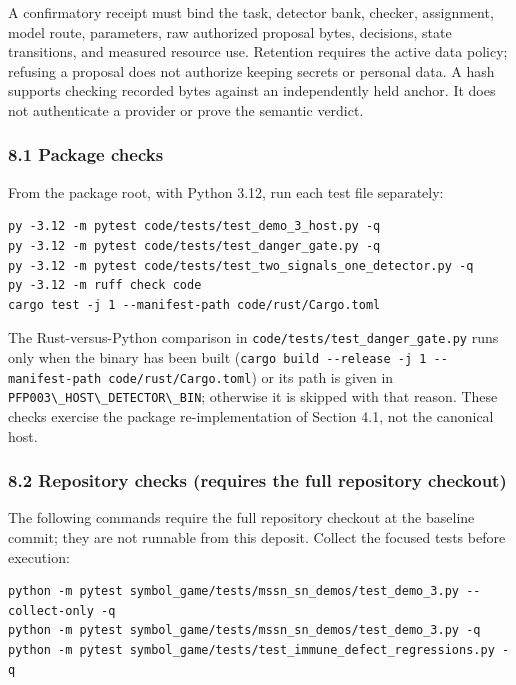 \documentclass[
  11pt,
]{article}
\newcommand{\passthrough}[1]{#1}
\begin{document}
A confirmatory receipt must bind the task, detector bank, checker,
assignment, model route, parameters, raw authorized proposal bytes,
decisions, state transitions, and measured resource use. Retention
requires the active data policy; refusing a proposal does not authorize
keeping secrets or personal data. A hash supports checking recorded
bytes against an independently held anchor. It does not authenticate a
provider or prove the semantic verdict.

\subsubsection{8.1 Package checks}\label{package-checks}

From the package root, with Python 3.12, run each test file separately:

\begin{lstlisting}
py -3.12 -m pytest code/tests/test_demo_3_host.py -q
py -3.12 -m pytest code/tests/test_danger_gate.py -q
py -3.12 -m pytest code/tests/test_two_signals_one_detector.py -q
py -3.12 -m ruff check code
cargo test -j 1 --manifest-path code/rust/Cargo.toml
\end{lstlisting}

The Rust-versus-Python comparison in
\nolinkurl{code/tests/test_danger_gate.py} runs only when the binary has
been built
(\passthrough{\lstinline!cargo build --release -j 1 --manifest-path code/rust/Cargo.toml!})
or its path is given in
\passthrough{\lstinline!PFP003\_HOST\_DETECTOR\_BIN!}; otherwise it is
skipped with that reason. These checks exercise the package
re-implementation of Section 4.1, not the canonical host.

\subsubsection{8.2 Repository checks (requires the full repository
checkout)}\label{repository-checks-requires-the-full-repository-checkout}

The following commands require the full repository checkout at the
baseline commit; they are not runnable from this deposit. Collect the
focused tests before execution:

\begin{lstlisting}
python -m pytest symbol_game/tests/mssn_sn_demos/test_demo_3.py --collect-only -q
python -m pytest symbol_game/tests/mssn_sn_demos/test_demo_3.py -q
python -m pytest symbol_game/tests/test_immune_defect_regressions.py -q
\end{lstlisting}
\end{document}
